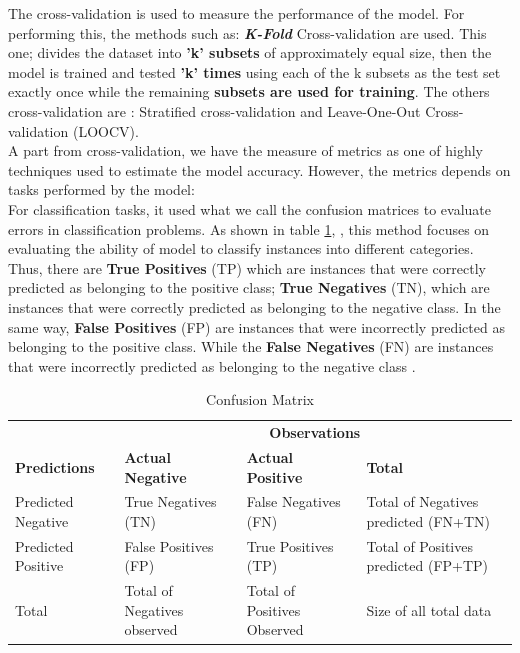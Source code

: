 \documentclass[12pt,a4paper, oneside]{book}
\begin{document}
The cross-validation is used to measure the performance of the model. For performing this, the methods such as: \textbf{\textit{K-Fold}} Cross-validation are used. This one; divides the dataset into \textbf{'k' subsets }of approximately equal size, then the model is trained and tested \textbf{'k' times} using each of the k subsets as the test set exactly once while the remaining \textbf{subsets are used for training}. The others cross-validation are : Stratified cross-validation and Leave-One-Out Cross-validation (LOOCV). \\

A part from cross-validation, we have the measure of metrics as one of highly techniques used to estimate the model accuracy. However, the metrics depends on tasks performed by the model: \\

For classification tasks, it used what we call the confusion matrices to evaluate errors in classification problems.
As shown in table \ref{tab:confusionMatrixTable}, \cite{raschka2018model} , this method focuses on evaluating the ability of model to classify instances into different categories. Thus, there are \textbf{True Positives} (TP) which are instances that were correctly predicted as belonging to the positive class; \textbf{True Negatives} (TN), which are instances that were correctly predicted as belonging to the negative class. In the same way, \textbf{False Positives} (FP) are instances that were incorrectly predicted as belonging to the positive class. While the \textbf{False Negatives} (FN) are instances that were incorrectly predicted as belonging to the negative class \cite{maria2016performance}. 
\begin{table}[h]
	\centering
	\begin{tabular}{|p{3cm}|p{3.5cm}|p{3cm}|p{5cm}|} 
		\cline{2-4}
		\multicolumn{1}{c|}{}& \multicolumn{3}{c|}{\textbf{Observations}}   \\
		\cline{1-4} 
		\textbf{Predictions}	& \textbf{Actual Negative} & \textbf{Actual Positive} & \textbf{Total}\\
		\hline
		Predicted Negative & True Negatives (TN) & False Negatives (FN) & Total of Negatives predicted  (FN+TN)\\
		\hline
		Predicted Positive & False Positives (FP) & True Positives (TP) & Total of Positives predicted  (FP+TP)\\
		\hline
		Total & Total of Negatives observed & Total of Positives Observed & Size of all total data\\
		\hline
	\end{tabular} 
	\caption{Confusion Matrix}
	\label{tab:confusionMatrixTable}
\end{table}
\end{document}

